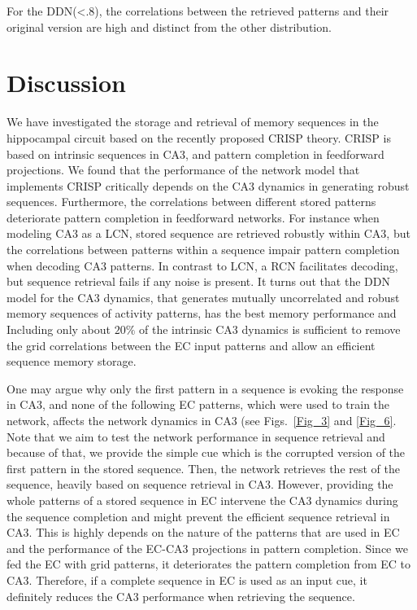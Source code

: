 \documentclass[utf8]{frontiersSCNS} %
\begin{document}
For the DDN(<.8), the correlations between the retrieved patterns and their original version are high and distinct from the other distribution.     

\section{Discussion}

We have investigated the storage and retrieval of memory sequences in the hippocampal circuit based on the recently proposed CRISP theory. CRISP is based on intrinsic sequences in CA3, and pattern completion in feedforward projections. We found that the performance of the network model that implements CRISP critically depends on the CA3 dynamics in generating robust sequences. Furthermore, the correlations between different stored patterns deteriorate pattern completion in feedforward networks. For instance when modeling CA3 as a LCN, stored sequence are retrieved robustly within CA3, but the  correlations between patterns within a sequence impair pattern completion when decoding CA3 patterns. In contrast to LCN, a RCN facilitates decoding, but sequence retrieval fails if any noise is present.
%
It turns out that the DDN model for the CA3 dynamics, that generates mutually uncorrelated and robust memory sequences of activity patterns, has the best memory performance and 
%
Including only about $20\%$ of the intrinsic CA3 dynamics is sufficient to remove the grid correlations between the EC input patterns and allow an efficient sequence memory storage.   
%

One may argue why only the first pattern in a sequence is evoking the response in CA3, and none of the following EC patterns, which were used to train the network, affects the network dynamics in CA3 (see Figs.~\ref{Fig_3} and \ref{Fig_6}.  
Note that we aim to test the network performance in sequence retrieval and because of that, we provide the simple cue which is the corrupted version of the first pattern in the stored sequence. Then, the network retrieves the rest of the sequence, heavily based on sequence retrieval in CA3. 
However, providing the whole patterns of a stored sequence in EC intervene the CA3 dynamics during the sequence completion and might prevent the efficient sequence retrieval in CA3. This is highly depends on the nature of the patterns that are used in EC and the performance of the EC-CA3 projections in pattern completion. Since we fed the EC with grid patterns, it deteriorates the pattern completion from EC to CA3. Therefore, if a complete sequence in EC is used as an input cue, it definitely reduces the CA3 performance when retrieving the sequence.
\end{document}
